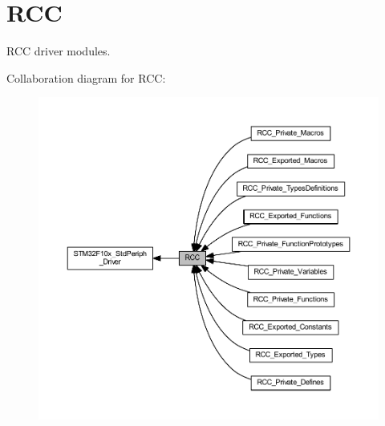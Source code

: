\hypertarget{group___r_c_c}{}\section{R\+CC}
\label{group___r_c_c}


R\+CC driver modules.  


Collaboration diagram for R\+CC\+:
\nopagebreak
\begin{figure}[H]
\begin{center}
\leavevmode
\includegraphics[width=350pt]{group___r_c_c}
\end{center}
\end{figure}
